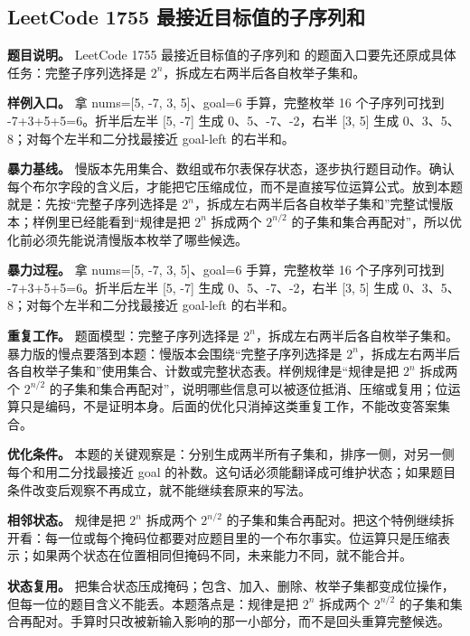 \subsection{LeetCode 1755 最接近目标值的子序列和}

\textbf{题目说明。} LeetCode 1755 最接近目标值的子序列和 的题面入口要先还原成具体任务：完整子序列选择是 \ensuremath{2^{n}}，拆成左右两半后各自枚举子集和。

\textbf{样例入口。} 拿 nums=[5, -7, 3, 5]、goal=6 手算，完整枚举 16 个子序列可找到 -7+3+5+5=6。折半后左半 [5, -7] 生成 0、5、-7、-2，右半 [3, 5] 生成 0、3、5、8；对每个左半和二分找最接近 goal-left 的右半和。

\textbf{暴力基线。} 慢版本先用集合、数组或布尔表保存状态，逐步执行题目动作。确认每个布尔字段的含义后，才能把它压缩成位，而不是直接写位运算公式。放到本题就是：先按“完整子序列选择是 \ensuremath{2^{n}}，拆成左右两半后各自枚举子集和”完整试慢版本；样例里已经能看到“规律是把 \ensuremath{2^{n}} 拆成两个 \ensuremath{2^{n/2}} 的子集和集合再配对”，所以优化前必须先能说清慢版本枚举了哪些候选。

\textbf{暴力过程。} 拿 nums=[5, -7, 3, 5]、goal=6 手算，完整枚举 16 个子序列可找到 -7+3+5+5=6。折半后左半 [5, -7] 生成 0、5、-7、-2，右半 [3, 5] 生成 0、3、5、8；对每个左半和二分找最接近 goal-left 的右半和。

\textbf{重复工作。} 题面模型：完整子序列选择是 \ensuremath{2^{n}}，拆成左右两半后各自枚举子集和。暴力版的慢点要落到本题：慢版本会围绕“完整子序列选择是 \ensuremath{2^{n}}，拆成左右两半后各自枚举子集和”使用集合、计数或完整状态表。样例规律是“规律是把 \ensuremath{2^{n}} 拆成两个 \ensuremath{2^{n/2}} 的子集和集合再配对”，说明哪些信息可以被逐位抵消、压缩或复用；位运算只是编码，不是证明本身。后面的优化只消掉这类重复工作，不能改变答案集合。

\textbf{优化条件。} 本题的关键观察是：分别生成两半所有子集和，排序一侧，对另一侧每个和用二分找最接近 goal 的补数。这句话必须能翻译成可维护状态；如果题目条件改变后观察不再成立，就不能继续套原来的写法。

\textbf{相邻状态。} 规律是把 \ensuremath{2^{n}} 拆成两个 \ensuremath{2^{n/2}} 的子集和集合再配对。把这个特例继续拆开看：每一位或每个掩码位都要对应题目里的一个布尔事实。位运算只是压缩表示；如果两个状态在位置相同但掩码不同，未来能力不同，就不能合并。

\textbf{状态复用。} 把集合状态压成掩码；包含、加入、删除、枚举子集都变成位操作，但每一位的题目含义不能丢。本题落点是：规律是把 \ensuremath{2^{n}} 拆成两个 \ensuremath{2^{n/2}} 的子集和集合再配对。手算时只改被新输入影响的那一小部分，而不是回头重算完整候选。

